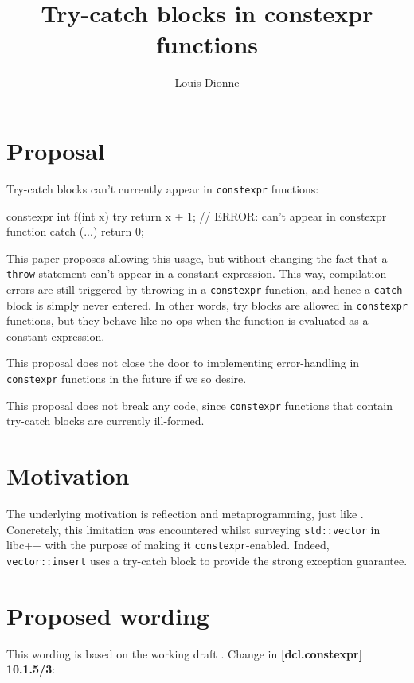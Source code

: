 \documentclass{wg21}
\title{Try-catch blocks in constexpr functions}
\author{Louis Dionne}{ldionne.2@gmail.com}
\newcommand{\cc}[1]{\texttt{#1}}
\begin{document}
\maketitle


\section{Proposal}
Try-catch blocks can't currently appear in \cc{constexpr} functions:

\begin{cpp}
  constexpr int f(int x) {
    try { return x + 1; } // ERROR: can't appear in constexpr function
    catch (...) { return 0; }
  }
\end{cpp}

This paper proposes allowing this usage, but without changing the fact that
a \cc{throw} statement can't appear in a constant expression. This way,
compilation errors are still triggered by throwing in a \cc{constexpr}
function, and hence a \cc{catch} block is simply never entered. In other
words, try blocks are allowed in \cc{constexpr} functions, but they behave
like no-ops when the function is evaluated as a constant expression.

This proposal does not close the door to implementing error-handling in
\cc{constexpr} functions in the future if we so desire.

This proposal does not break any code, since \cc{constexpr} functions that
contain try-catch blocks are currently ill-formed.


\section{Motivation}
The underlying motivation is reflection and metaprogramming, just like
\cite{P0784R1}. Concretely, this limitation was encountered whilst surveying
\cc{std::vector} in libc++ with the purpose of making it \cc{constexpr}-enabled.
Indeed, \cc{vector::insert} uses a try-catch block to provide the strong
exception guarantee.


\section{Proposed wording}
This wording is based on the working draft \cite{N4727}. Change in
\textbf{[dcl.constexpr] 10.1.5/3}:
\end{document}
